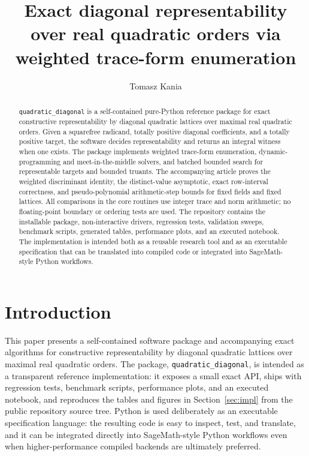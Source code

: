 \documentclass[manuscript]{acmart}
\title[Exact diagonal representability over real quadratic orders]{Exact diagonal representability over real quadratic orders via weighted trace-form enumeration}
\author{Tomasz Kania}
\affiliation{%
  \institution{Institute of Mathematics, Czech Academy of Sciences}
  \city{Prague}
  \country{Czech Republic}}
\affiliation{%
  \institution{Institute of Mathematics, Jagiellonian University}
  \city{Krak\'ow}
  \country{Poland}}
\theoremstyle{plain}
\theoremstyle{definition}
\theoremstyle{nonitalicremark}
\begin{document}
\begin{abstract}
\texttt{quadratic\_diagonal} is a self-contained pure-Python reference package for exact
constructive representability by diagonal quadratic lattices over maximal real quadratic orders.
Given a squarefree radicand, totally positive diagonal coefficients, and a totally positive target,
the software decides representability and returns an integral witness when one exists. The package
implements weighted trace-form enumeration, dynamic-programming and meet-in-the-middle solvers,
and batched bounded search for representable targets and bounded truants. The accompanying article
proves the weighted discriminant identity, the distinct-value asymptotic, exact row-interval
correctness, and pseudo-polynomial arithmetic-step bounds for fixed fields and fixed lattices. All
comparisons in the core routines use integer trace and norm arithmetic; no floating-point boundary
or ordering tests are used. The repository contains the installable package, non-interactive drivers,
regression tests, validation sweeps, benchmark scripts, generated tables, performance plots, and an
executed notebook. The implementation is intended both as a reusable research tool and as an
executable specification that can be translated into compiled code or integrated into SageMath-style
Python workflows.
\end{abstract}




\maketitle

\section{Introduction}

This paper presents a self-contained software package and accompanying exact algorithms for
constructive representability by diagonal quadratic lattices over maximal real quadratic orders. The
package, \texttt{quadratic\_diagonal}, is intended as a transparent reference implementation: it
exposes a small exact API, ships with regression tests, benchmark scripts, performance plots, and an
executed notebook, and reproduces the tables and figures in Section~\ref{sec:impl} from the public
repository source tree. Python is used deliberately as an executable specification language: the
resulting code is easy to inspect, test, and translate, and it can be integrated directly into
SageMath-style Python workflows even when higher-performance compiled backends are ultimately
preferred.
\end{document}
